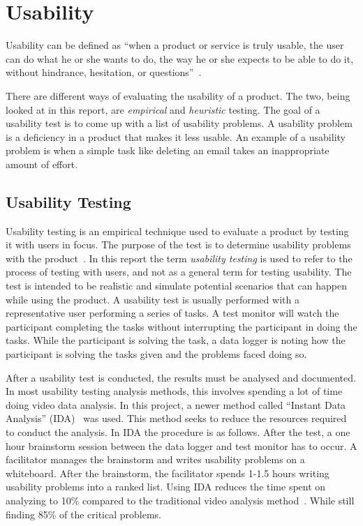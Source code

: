 \section{Usability}
\label{sub:usability}

Usability can be defined as \enquote{when a product or service is truly usable, the user can do what he or she wants to do, the way he or she expects to be able to do it, without hindrance, hesitation, or questions}~\cite{RubinChisnellSpool08}.

There are different ways of evaluating the usability of a product. The two, being looked at in this report, are \textit{empirical} and \textit{heuristic} testing. The goal of a usability test is to come up with a list of usability problems. A usability problem is a deficiency in a product that makes it less usable. An example of a usability problem is when a simple task like deleting an email takes an inappropriate amount of effort.

\subsection{Usability Testing}
\label{sub:usabilityTesting}
Usability testing is an empirical technique used to evaluate a product by testing it with users in focus. The purpose of the test is to determine usability problems with the product~\cite{RubinChisnellSpool08}. In this report the term \emph{usability testing} is used to refer to the process of testing with users, and not as a general term for testing usability. The test is intended to be realistic and simulate potential scenarios that can happen while using the product. A usability test is usually performed with a representative user performing a series of tasks. A test monitor will watch the participant completing the tasks without interrupting the participant in doing the tasks. While the participant is solving the task, a data logger is noting how the participant is solving the tasks given and the problems faced doing so.

After a usability test is conducted, the results must be analysed and documented. In most usability testing analysis methods, this involves spending a lot of time doing video data analysis. In this project, a newer method called \enquote{Instant Data Analysis} (IDA)~\cite{kjeldskov2004instant} was used. This method seeks to reduce the resources required to conduct the analysis. In IDA the procedure is as follows. After the test, a one hour brainstorm session between the data logger and test monitor has to occur. A facilitator manages the brainstorm and writes usability problems on a whiteboard. After the brainstorm, the facilitator spends 1-1.5 hours writing usability problems into a ranked list. Using IDA reduces the time spent on analyzing to 10\% compared to the traditional video analysis method~\cite{kjeldskov2004instant}. While still finding 85\% of the critical problems.

